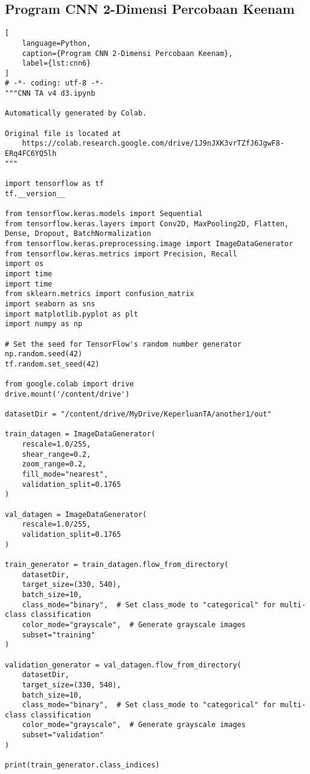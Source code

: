 \subsection*{Program CNN 2-Dimensi Percobaan Keenam}
\begin{lstlisting}[
    language=Python,
    caption={Program CNN 2-Dimensi Percobaan Keenam},
    label={lst:cnn6}
]
# -*- coding: utf-8 -*-
"""CNN TA v4 d3.ipynb

Automatically generated by Colab.

Original file is located at
    https://colab.research.google.com/drive/1J9nJXK3vrTZfJ6JgwF8-ERq4FC6YQ5lh
"""

import tensorflow as tf
tf.__version__

from tensorflow.keras.models import Sequential
from tensorflow.keras.layers import Conv2D, MaxPooling2D, Flatten, Dense, Dropout, BatchNormalization
from tensorflow.keras.preprocessing.image import ImageDataGenerator
from tensorflow.keras.metrics import Precision, Recall
import os
import time
import time
from sklearn.metrics import confusion_matrix
import seaborn as sns
import matplotlib.pyplot as plt
import numpy as np

# Set the seed for TensorFlow's random number generator
np.random.seed(42)
tf.random.set_seed(42)

from google.colab import drive
drive.mount('/content/drive')

datasetDir = "/content/drive/MyDrive/KeperluanTA/another1/out"

train_datagen = ImageDataGenerator(
    rescale=1.0/255,
    shear_range=0.2,
    zoom_range=0.2,
    fill_mode="nearest",
    validation_split=0.1765
)

val_datagen = ImageDataGenerator(
    rescale=1.0/255,
    validation_split=0.1765
)

train_generator = train_datagen.flow_from_directory(
    datasetDir,
    target_size=(330, 540),
    batch_size=10,
    class_mode="binary",  # Set class_mode to "categorical" for multi-class classification
    color_mode="grayscale",  # Generate grayscale images
    subset="training"
)

validation_generator = val_datagen.flow_from_directory(
    datasetDir,
    target_size=(330, 540),
    batch_size=10,
    class_mode="binary",  # Set class_mode to "categorical" for multi-class classification
    color_mode="grayscale",  # Generate grayscale images
    subset="validation"
)

print(train_generator.class_indices)


\end{lstlisting}

